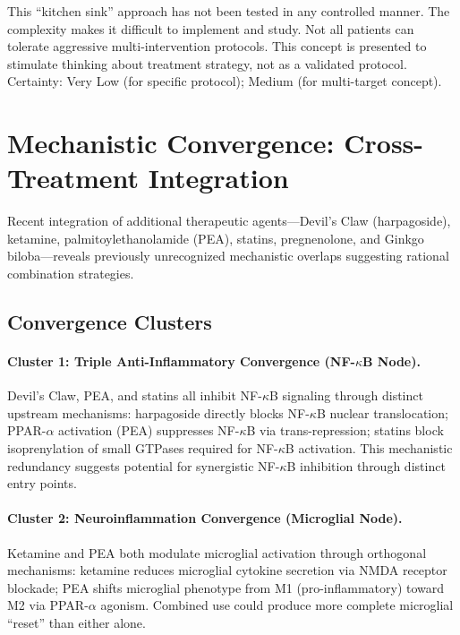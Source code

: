 \begin{warning}
This ``kitchen sink'' approach has not been tested in any controlled manner. The complexity makes it difficult to implement and study. Not all patients can tolerate aggressive multi-intervention protocols. This concept is presented to stimulate thinking about treatment strategy, not as a validated protocol. Certainty: Very Low (for specific protocol); Medium (for multi-target concept).
\end{warning}

\section{Mechanistic Convergence: Cross-Treatment Integration}
\label{sec:mechanistic-convergence-novel}

Recent integration of additional therapeutic agents---Devil's Claw (harpagoside), ketamine, palmitoylethanolamide (PEA), statins, pregnenolone, and Ginkgo biloba---reveals previously unrecognized mechanistic overlaps suggesting rational combination strategies.

\subsection{Convergence Clusters}

\paragraph{Cluster 1: Triple Anti-Inflammatory Convergence (NF-$\kappa$B Node).}
Devil's Claw, PEA, and statins all inhibit NF-$\kappa$B signaling through distinct upstream mechanisms: harpagoside directly blocks NF-$\kappa$B nuclear translocation; PPAR-$\alpha$ activation (PEA) suppresses NF-$\kappa$B via trans-repression; statins block isoprenylation of small GTPases required for NF-$\kappa$B activation. This mechanistic redundancy suggests potential for synergistic NF-$\kappa$B inhibition through distinct entry points.

\paragraph{Cluster 2: Neuroinflammation Convergence (Microglial Node).}
Ketamine and PEA both modulate microglial activation through orthogonal mechanisms: ketamine reduces microglial cytokine secretion via NMDA receptor blockade; PEA shifts microglial phenotype from M1 (pro-inflammatory) toward M2 via PPAR-$\alpha$ agonism. Combined use could produce more complete microglial ``reset'' than either alone.

